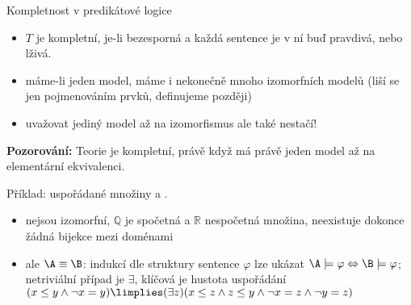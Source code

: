 \documentclass{beamer}
\begin{document}
\begin{frame}{Kompletnost v predikátové logice}


    
    \begin{itemize}
        \item $T$ je \alert{kompletní}, je-li bezesporná a každá \alert{sentence} je v ní buď pravdivá, nebo lživá. \pause
        \item máme-li jeden model, máme i nekonečně mnoho \alert{izomorfních} modelů (liší se jen pojmenováním prvků, definujeme později)\pause
        \item uvažovat jediný model \alert{až na izomorfismus} ale také \alert{nestačí}!\pause
    \end{itemize}
    
 
    \pause
    \textbf{Pozorování:} Teorie je kompletní, právě když má právě jeden model \alert{až na elementární ekvivalenci}.   

    \pause
    Příklad: uspořádané množiny  a .\pause
     \begin{itemize}
        \item \alert{nejsou izomorfní}, $\mathbb Q$ je spočetná a $\mathbb R$ nespočetná množina, neexistuje dokonce žádná \alert{bijekce} mezi doménami\pause
        \item \alert{ale $\A\equiv\B$}: indukcí dle struktury sentence $\varphi$ lze ukázat $\A\models\varphi\Leftrightarrow\B\models\varphi$; netriviální případ je $\exists$, klíčová je \alert{hustota} uspořádání $(x\leq y\land \neg x=y)\limplies(\exists z)(x\leq z\land z\leq y\land \neg x=z\land\neg y=z)$
     \end{itemize}     

\end{frame}
\end{document}
